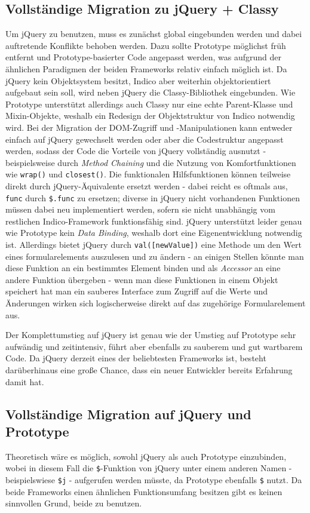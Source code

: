\subsection{Vollständige Migration zu jQuery + Classy}
Um jQuery zu benutzen, muss es zunächst global eingebunden werden und dabei auftretende Konflikte
behoben werden. Dazu sollte Prototype möglichst früh entfernt und Prototype-basierter Code angepasst
werden, was aufgrund der ähnlichen Paradigmen der beiden Frameworks relativ einfach möglich ist.
Da jQuery kein Objektsystem besitzt, Indico aber weiterhin objektorientiert aufgebaut sein soll,
wird neben jQuery die Classy-Bibliothek eingebunden. Wie Prototype unterstützt allerdings auch
Classy nur eine echte Parent-Klasse und Mixin-Objekte, weshalb ein Redesign der Objektstruktur von
Indico notwendig wird. Bei der Migration der DOM-Zugriff und -Manipulationen kann entweder einfach
auf jQuery gewechselt werden oder aber die Codestruktur angepasst werden, sodass der Code die
Vorteile von jQuery vollständig ausnutzt - beispielsweise durch \emph{Method Chaining} und die
Nutzung von Komfortfunktionen wie \lstinline{wrap()} und \lstinline{closest()}. Die funktionalen
Hilfsfunktionen können teilweise direkt durch jQuery-Äquivalente ersetzt werden - dabei reicht es
oftmals aus, \lstinline{func} durch \lstinline{$.func} zu ersetzen; diverse in jQuery nicht
vorhandenen Funktionen müssen dabei neu implementiert werden, sofern sie nicht unabhängig vom
restlichen Indico-Framework funktionsfähig sind. jQuery unterstützt leider genau wie Prototype kein
\emph{Data Binding}, weshalb dort eine Eigenentwicklung notwendig ist. Allerdings bietet jQuery
durch \lstinline{val([newValue])} eine Methode um den Wert eines formularelements auszulesen und zu
ändern - an einigen Stellen könnte man diese Funktion an ein bestimmtes Element binden und als
\emph{Accessor} an eine andere Funktion übergeben - wenn man diese Funktionen in einem Objekt
speichert hat man ein sauberes Interface zum Zugriff auf die Werte und Änderungen wirken sich
logischerweise direkt auf das zugehörige Formularelement aus.

Der Komplettumstieg auf jQuery ist genau wie der Umstieg auf Prototype sehr aufwändig und
zeitintensiv, führt aber ebenfalls zu sauberem und gut wartbarem Code. Da jQuery derzeit eines der
beliebtesten Frameworks ist, besteht darüberhinaus eine große Chance, dass ein neuer Entwickler
bereits Erfahrung damit hat.


\subsection{Vollständige Migration auf jQuery und Prototype}
Theoretisch wäre es möglich, sowohl jQuery als auch Prototype einzubinden, wobei in diesem Fall die
\lstinline{$}-Funktion von jQuery unter einem anderen Namen - beispielswiese \lstinline{$j} -
aufgerufen werden müsste, da Prototype ebenfalls \lstinline{$} nutzt. Da beide Frameworks einen
ähnlichen Funktionsumfang besitzen gibt es keinen sinnvollen Grund, beide zu benutzen.


